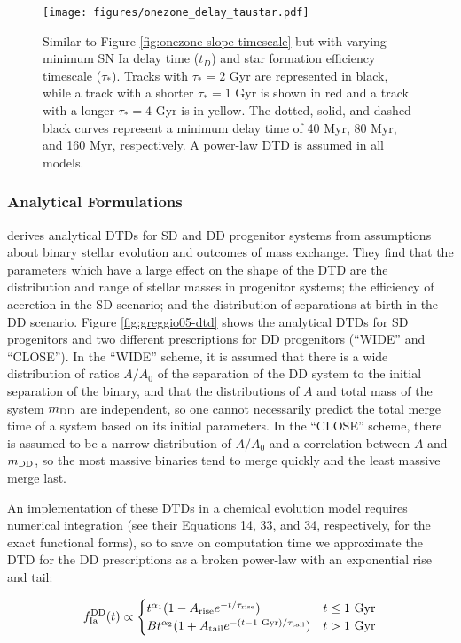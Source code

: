 \documentclass[twocolumn]{aastex631}
\begin{document}
\begin{figure}
    \centering
    \texttt{[image: figures/onezone\_delay\_taustar.pdf]}
    \caption{Similar to Figure \ref{fig:onezone-slope-timescale} but with varying minimum SN Ia delay time ($t_D$) and star formation efficiency timescale ($\tau_*$). Tracks with $\tau_*=2$ Gyr are represented in black, while a track with a shorter $\tau_*=1$ Gyr is shown in red and a track with a longer $\tau_*=4$ Gyr is in yellow. The dotted, solid, and dashed black curves represent a minimum delay time of 40 Myr, 80 Myr, and 160 Myr, respectively. A power-law DTD is assumed in all models.}
    \label{fig:onezone-delay-taustar}
\end{figure}

\subsubsection{Analytical Formulations}

\citet{Greggio2005-AnalyticalRates} derives analytical DTDs for SD and DD progenitor systems from assumptions about binary stellar evolution and outcomes of mass exchange. They find that the parameters which have a large effect on the shape of the DTD are the distribution and range of stellar masses in progenitor systems; the efficiency of accretion in the SD scenario; and the distribution of separations at birth in the DD scenario. Figure \ref{fig:greggio05-dtd} shows the analytical DTDs for SD progenitors and two different prescriptions for DD progenitors (``WIDE'' and ``CLOSE''). In the ``WIDE'' scheme, it is assumed that there is a wide distribution of ratios $A/A_0$ of the separation of the DD system to the initial separation of the binary, and that the distributions of $A$ and total mass of the system $m_{\rm{DD}}$ are independent, so one cannot necessarily predict the total merge time of a system based on its initial parameters. In the ``CLOSE'' scheme, there is assumed to be a narrow distribution of $A/A_0$ and a correlation between $A$ and $m_{\rm{DD}}$, so the most massive binaries tend to merge quickly and the least massive merge last.

An implementation of these DTDs in a chemical evolution model requires numerical integration (see their Equations 14, 33, and 34, respectively, for the exact functional forms), so to save on computation time we approximate the DTD for the DD prescriptions as a broken power-law with an exponential rise and tail:

\begin{equation}
    f_{\rm{Ia}}^{\rm{DD}}(t) \propto
    \begin{cases}
        t^{\alpha_1} (1 - A_{\rm{rise}} e^{-t/\tau_{\rm{rise}}}) & t \le 1~\rm{Gyr} \\
        B t^{\alpha_2} (1 + A_{\rm{tail}} e^{-(t - 1~\rm{Gyr})/\tau_{\rm{tail}}}) & t > 1~\rm{Gyr}
    \end{cases}
    \label{eq:greggio05-approx}
\end{equation}
\end{document}
